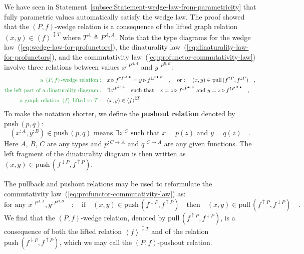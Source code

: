 We have seen in Statement~\ref{subsec:Statement-wedge-law-from-parametricity}
that fully parametric values automatically satisfy the wedge law.
The proof showed that the $\left(P,f\right)$-wedge relation is a
consequence of the lifted graph relation $(x,y)\in\left<f\right>^{\updownarrow T}$
where $T^{A}\triangleq P^{A,A}$. Note that the type diagrams for
the wedge law~(\ref{eq:wedge-law-for-profunctors}), the dinaturality
law~(\ref{eq:dinaturality-law-for-profunctors}), and the commutativity
law~(\ref{eq:profunctor-commutativity-law}) involve three relations
between values $x^{:P^{A,A}}$ and $y^{:P^{B,B}}$:
\begin{align*}
{\color{greenunder}\text{a }\left(P,f\right)\text{-wedge relation}:}\quad & x\triangleright f^{\uparrow P^{A,\bullet}}=y\triangleright f^{\downarrow P^{\bullet,B}}\quad,\quad\text{or}:\quad(x,y)\in\text{pull}\,(f^{\uparrow P},f^{\downarrow P})\quad,\\
{\color{greenunder}\text{the left part of a dinaturality diagram}:}\quad & \exists z^{:P^{B,A}}\quad\text{such that}\quad x=z\triangleright f^{\downarrow P^{\bullet,A}}\text{ and }y=z\triangleright f^{\uparrow P^{B,\bullet}}\quad,\\
{\color{greenunder}\text{a graph relation }\left<f\right>\text{ lifted to }T:}\quad & (x,y)\in\left<f\right>^{\updownarrow T}\quad.
\end{align*}
To make the notation shorter, we define the \textbf{pushout} \textbf{relation}
denoted by $\text{push}\,(p,q)$:
\[
(x^{:A},y^{:B})\in\text{push}\,(p,q)\text{ means }\exists z^{:C}\text{ such that }x=p(z)\text{ and }y=q(z)\quad.
\]
Here $A$, $B$, $C$ are any types and $p^{:C\rightarrow A}$ and
$q^{:C\rightarrow A}$ are any given functions. The left fragment
of the dinaturality diagram is then written as $(x,y)\in\text{push}\,(f^{\downarrow P},f^{\uparrow P})$.

The pullback and pushout relations may be used to reformulate the
commutativity law~(\ref{eq:profunctor-commutativity-law}) as: 
\[
\text{for any }x^{:P^{A,A}},y^{:P^{B,B}}\quad:\quad\text{if}\quad(x,y)\in\text{push}\,(f^{\downarrow P},f^{\uparrow P})\quad\text{then}\quad(x,y)\in\text{pull}\,(f^{\uparrow P},f^{\downarrow P})\quad.
\]
We find that the $\left(P,f\right)$-wedge relation, denoted by $\text{pull}\,(f^{\uparrow P},f^{\downarrow P})$,
is a consequence of both the lifted relation $\left<f\right>^{\updownarrow T}$
and of the relation $\text{push}\,(f^{\downarrow P},f^{\uparrow P})$,
which we may call the $\left(P,f\right)$-pushout relation.

